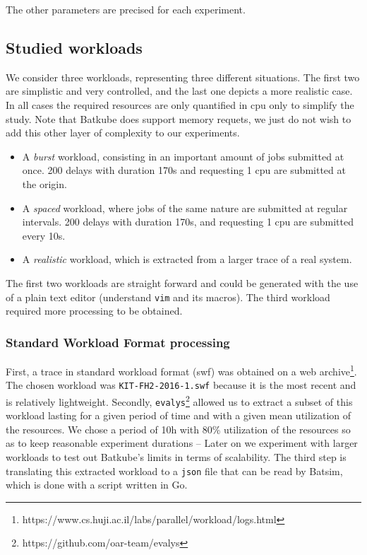 \documentclass[12pt, a4paper]{memoir}
\begin{document}
The other parameters are precised for each experiment.

\subsection{Studied workloads}

We consider three workloads, representing three different situations. The first
two are simplistic and very controlled, and the last one depicts a more
realistic case. In all cases the required resources are only quantified in cpu
only to simplify the study. Note that Batkube does support memory requets, we
just do not wish to add this other layer of complexity to our experiments.

\begin{itemize}
	\item A \textit{burst} workload, consisting in an important amount of
		jobs submitted at once.  200 delays with duration 170s and
		requesting 1 cpu are submitted at the origin.
	\item A \textit{spaced} workload, where jobs of the same nature are
		submitted at regular intervals.  200 delays with duration 170s,
		and requesting 1 cpu are submitted every 10s.
	\item A \textit{realistic} workload, which is extracted from a larger
		trace of a real system.
\end{itemize}

The first two workloads are straight forward and could be generated with the
use of a plain text editor (understand \texttt{vim} and its macros). The third
workload required more processing to be obtained.  

\subsubsection{Standard Workload Format processing}

First, a trace in standard
workload format (swf) was obtained on a web
archive\footnote{https://www.cs.huji.ac.il/labs/parallel/workload/logs.html}.
The chosen workload was \texttt{KIT-FH2-2016-1.swf} because it is the most
recent and is relatively lightweight. Secondly,
\texttt{evalys}\footnote{https://github.com/oar-team/evalys} allowed us to
extract a subset of this workload lasting for a given period of time and with a
given mean utilization of the resources. We chose a period of 10h with 80\%
utilization of the resources so as to keep reasonable experiment durations --
Later on we experiment with larger workloads to test out Batkube's limits in
terms of scalability.  The third step is translating this extracted workload to
a \texttt{json} file that can be read by Batsim, which is done with a script
written in Go.
\end{document}
